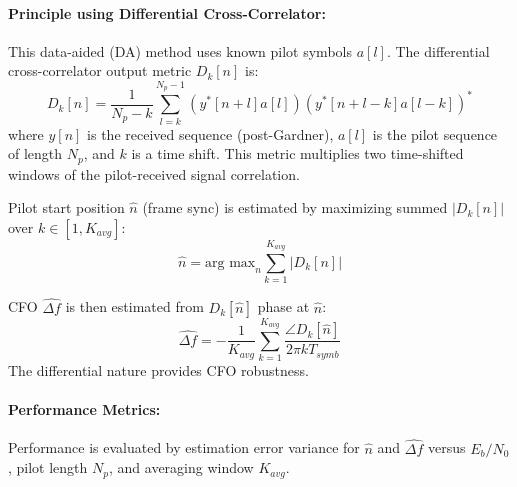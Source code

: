 \documentclass[11pt]{article}
\begin{document}
	\paragraph{Principle using Differential Cross-Correlator:}
	This data-aided (DA) method uses known pilot symbols $a[l]$. The differential cross-correlator output metric $D_k[n]$ is:
	\begin{equation}
		D_k[n] = \frac{1}{N_p-k} \sum_{l=k}^{N_p-1} (y^*[n+l]a[l])(y^*[n+l-k]a[l-k])^*
		\label{eq:diff_corr_metric_style_change}
	\end{equation}
	where $y[n]$ is the received sequence (post-Gardner), $a[l]$ is the pilot sequence of length $N_p$, and $k$ is a time shift. This metric multiplies two time-shifted windows of the pilot-received signal correlation.
	
	Pilot start position $\hat{n}$ (frame sync) is estimated by maximizing summed $|D_k[n]|$ over $k \in [1, K_{avg}]$:
	\begin{equation}
		\hat{n} = \text{arg max}_n \sum_{k=1}^{K_{avg}} |D_k[n]|
		\label{eq:frame_sync_est_style_change}
	\end{equation}
	
	CFO $\hat{\Delta f}$ is then estimated from $D_k[\hat{n}]$ phase at $\hat{n}$:
	\begin{equation}
		\hat{\Delta f} = -\frac{1}{K_{avg}} \sum_{k=1}^{K_{avg}} \frac{\angle D_k[\hat{n}]}{2\pi k T_{symb}}
		\label{eq:cfo_est_diff_corr_style_change}
	\end{equation}
	The differential nature provides CFO robustness.
	
	\paragraph{Performance Metrics:}
	Performance is evaluated by estimation error variance for $\hat{n}$ and $\hat{\Delta f}$ versus $E_b/N_0$, pilot length $N_p$, and averaging window $K_{avg}$.
	
\end{document}
